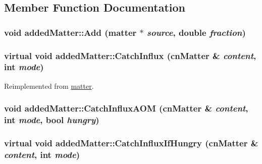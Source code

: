 \subsection{Member Function Documentation}
\hypertarget{classadded_matter_a14ebb9ad01566cdc7e48ae871aa719f6}{
\subsubsection[{Add}]{\setlength{\rightskip}{0pt plus 5cm}void addedMatter::Add ({\bf matter} $\ast$ {\em source}, \/  double {\em fraction})}}
\label{classadded_matter_a14ebb9ad01566cdc7e48ae871aa719f6}
\hypertarget{classadded_matter_a453f802edd746aeb213c26c823678517}{
\subsubsection[{CatchInflux}]{\setlength{\rightskip}{0pt plus 5cm}virtual void addedMatter::CatchInflux ({\bf cnMatter} \& {\em content}, \/  int {\em mode})}}
\label{classadded_matter_a453f802edd746aeb213c26c823678517}


Reimplemented from \hyperlink{classmatter_a5ad9b7b66c194958cdf58ec47024c0c9}{matter}.\hypertarget{classadded_matter_a6903d04f88ba89f70f48f09f6d3b6526}{
\subsubsection[{CatchInfluxAOM}]{\setlength{\rightskip}{0pt plus 5cm}void addedMatter::CatchInfluxAOM ({\bf cnMatter} \& {\em content}, \/  int {\em mode}, \/  bool {\em hungry})}}
\label{classadded_matter_a6903d04f88ba89f70f48f09f6d3b6526}
\hypertarget{classadded_matter_a82ac9bf0ca59c436d6f393467b3bb70a}{
\subsubsection[{CatchInfluxIfHungry}]{\setlength{\rightskip}{0pt plus 5cm}virtual void addedMatter::CatchInfluxIfHungry ({\bf cnMatter} \& {\em content}, \/  int {\em mode})}}
\label{classadded_matter_a82ac9bf0ca59c436d6f393467b3bb70a}


